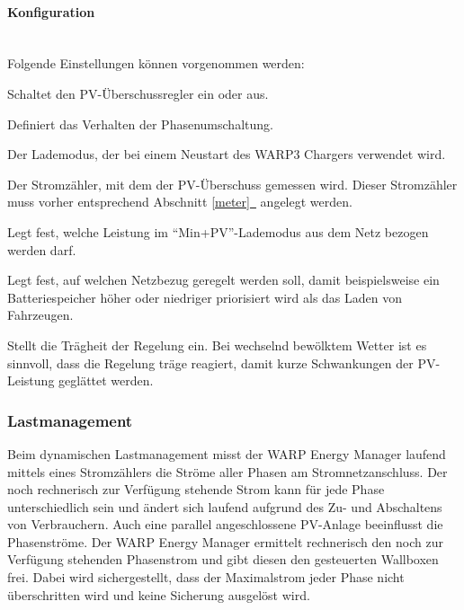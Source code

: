 \documentclass[a4paper,10pt]{article}
\newcommand*{\fullref}[1]{Abschnitt \hyperref[{#1}]{\ref*{#1}~\nameref*{#1}}}
\begin{document}
\begin{multicols*}{2}
	\paragraph{Konfiguration}\ \\
	Folgende Einstellungen können vorgenommen werden:
	\begin{description}[labelindent=0.5cm, leftmargin=0.5cm]
		\item[Überschussladen aktiviert] Schaltet den PV-Über\-schuss\-regler ein oder aus.
		\item[Umschaltungsmodus] Definiert das Verhalten der Phasenumschaltung.
		\item[Standardlademodus] Der Lademodus, der bei einem Neustart des WARP3 Chargers verwendet wird.
		\item[Stromzähler] Der Stromzähler, mit dem der PV-Überschuss gemessen wird. Dieser Stromzähler muss vorher entsprechend \fullref{meter} angelegt werden.
		\item[Min+PV: Mindestladeleistung] Legt fest, welche Leistung im \enquote{Min+PV}-Lademodus aus dem Netz bezogen werden darf.
		\item[Regelverhalten] Legt fest, auf welchen
		Netzbezug geregelt werden soll, damit beispielsweise ein Batteriespeicher höher oder niedriger priorisiert wird als das Laden von Fahrzeugen.
		\item[Wolkenfilter] Stellt die Trägheit der Regelung
		ein. Bei wechselnd bewölktem Wetter ist es sinnvoll, dass die Regelung
		träge reagiert, damit kurze Schwankungen der PV-Leistung geglättet werden.
	\end{description}
    
    
    
	\subsubsection{Lastmanagement}

	Beim dynamischen Lastmanagement misst der WARP Energy Manager laufend mittels eines Stromzählers die
	Ströme aller Phasen am Stromnetzanschluss. Der noch rechnerisch zur
	Verfügung stehende Strom kann für jede Phase unterschiedlich sein und ändert
	sich laufend aufgrund des Zu- und Abschaltens von Verbrauchern. Auch eine
	parallel angeschlossene PV-Anlage beeinflusst die Phasenströme. Der WARP
	Energy Manager ermittelt rechnerisch den noch zur Verfügung stehenden
	Phasenstrom und gibt diesen den gesteuerten Wallboxen frei.
	Dabei wird sichergestellt, dass der Maximalstrom jeder Phase nicht überschritten wird und keine Sicherung ausgelöst wird.


\end{multicols*}
\end{document}
